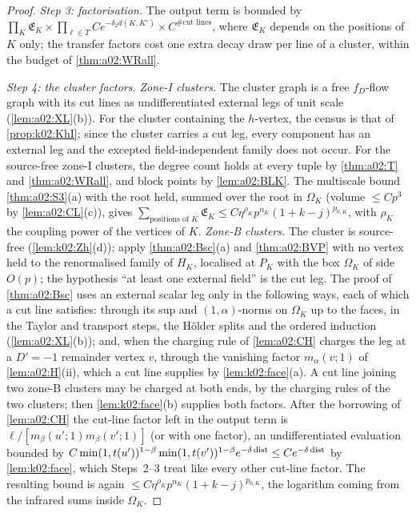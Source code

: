 \begin{proof}
\emph{Step 3: factorisation.} The output term is bounded by $\prod_K\mathfrak E_K\times\prod_{\ell\in T}Ce^{-\delta_2d(K,K')}\times C^{\#\text{cut lines}}$, where $\mathfrak E_K$ depends on the positions of $K$ only; the transfer factors cost one extra decay draw per line of a cluster, within the budget of \cref{thm:a02:WRall}.

\emph{Step 4: the cluster factors.} \emph{Zone-I clusters.} The cluster graph is a free $f_D$-flow graph with its cut lines as undifferentiated external legs of unit scale (\cref{lem:a02:XL}(b)). For the cluster containing the $h$-vertex, the census is that of \cref{prop:k02:KhI}; since the cluster carries a cut leg, every component has an external leg and the excepted field-independent family does not occur. For the source-free zone-I clusters, the degree count holds at every tuple by \cref{thm:a02:T} and \cref{thm:a02:WRall}, and block points by \cref{lem:a02:BLK}. The multiscale bound \cref{thm:a02:S3}(a) with the root held, summed over the root in $\Omega_K$ (volume $\le Cp^3$ by \cref{lem:a02:CL}(c)), gives $\sum_{\text{positions of }K}\mathfrak E_K\le C\eta^{\rho_K}p^{n_K}(1+k-j)^{p_{0,K}}$, with $\rho_K$ the coupling power of the vertices of $K$. \emph{Zone-B clusters.} The cluster is source-free (\cref{lem:k02:Zh}(d)); apply \cref{thm:a02:Bsc}(a) and \cref{thm:a02:BVP} with no vertex held to the renormalised family of $H_K$, localised at $P_K$ with the box $\Omega_K$ of side $O(p)$; the hypothesis ``at least one external field'' is the cut leg. The proof of \cref{thm:a02:Bsc} uses an external scalar leg only in the following ways, each of which a cut line satisfies: through its sup and $(1,\alpha)$-norms on $\Omega_K$ up to the faces, in the Taylor and transport steps, the H\"older splits and the ordered induction (\cref{lem:a02:XL}(b)); and, when the charging rule of \cref{lem:a02:CH} charges the leg at a $D'=-1$ remainder vertex $v$, through the vanishing factor $m_\alpha(v;1)$ of \cref{lem:a02:H}(ii), which a cut line supplies by \cref{lem:k02:face}(a). A cut line joining two zone-B clusters may be charged at both ends, by the charging rules of the two clusters; then \cref{lem:k02:face}(b) supplies both factors. After the borrowing of \cref{lem:a02:CH} the cut-line factor left in the output term is $\ell/[m_\beta(u';1)m_\beta(v';1)]$ (or with one factor), an undifferentiated evaluation bounded by $C\min(1,t(u'))^{1-\beta}\min(1,t(v'))^{1-\beta}e^{-\delta\operatorname{dist}}\le Ce^{-\delta\operatorname{dist}}$ by \cref{lem:k02:face}, which Steps~2--3 treat like every other cut-line factor. The resulting bound is again $\le C\eta^{\rho_K}p^{n_K}(1+k-j)^{p_{0,K}}$, the logarithm coming from the infrared sums inside $\Omega_K$.


\end{proof}
